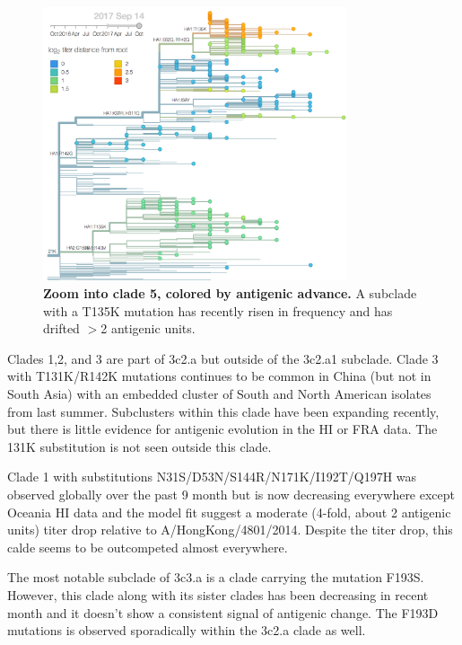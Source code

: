 \documentclass[11pt,oneside,letterpaper]{article}
\begin{document}
\begin{figure}[h!]
  \centering
  \includegraphics[width=0.8\textwidth]{../figures/sep-2017/h3n2_tree_135k.png}
  \caption{\textbf{Zoom into clade 5, colored by antigenic advance.} A subclade with a T135K mutation has recently risen in frequency and has drifted $>$2 antigenic units.
  }
  \label{H3N2_135K}
\end{figure}

Clades 1,2, and 3 are part of 3c2.a but outside of the 3c2.a1 subclade.
Clade 3 with T131K/R142K mutations continues to be common in China (but
not in South Asia) with an embedded cluster of South and North American
isolates from last summer. Subclusters within this clade have been
expanding recently, but there is little evidence for antigenic evolution
in the HI or FRA data. The 131K substitution is not seen outside this
clade.

Clade 1 with substitutions N31S/D53N/S144R/N171K/I192T/Q197H was
observed globally over the past 9 month but is now decreasing everywhere
except Oceania HI data and the model fit suggest a moderate (4-fold,
about 2 antigenic units) titer drop relative to A/HongKong/4801/2014.
Despite the titer drop, this calde seems to be outcompeted almost
everywhere.

The most notable subclade of 3c3.a is a clade carrying the mutation
F193S. However, this clade along with its sister clades has been
decreasing in recent month and it doesn't show a consistent signal of
antigenic change. The F193D mutations is observed sporadically within
the 3c2.a clade as well.

\end{document}

